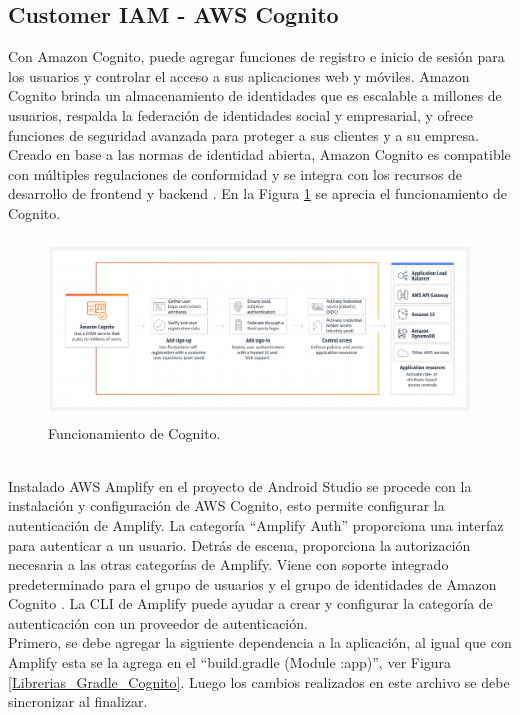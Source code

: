 \documentclass[a4paper,10pt, oneside, titlepage]{article}
\begin{document}
	\subsection{Customer IAM - AWS Cognito}
	Con Amazon Cognito, puede agregar funciones de registro e inicio de sesión para los usuarios y controlar el acceso a sus aplicaciones web y móviles. Amazon Cognito brinda un almacenamiento de identidades que es escalable a millones de usuarios, respalda la federación de identidades social y empresarial, y ofrece funciones de seguridad avanzada para proteger a sus clientes y a su empresa. Creado en base a las normas de identidad abierta, Amazon Cognito es compatible con múltiples regulaciones de conformidad y se integra con los recursos de desarrollo de frontend y backend \cite{Cognito}. En la Figura \ref{Funcionamiento_Cognito} se aprecia el funcionamiento de Cognito.
	\begin{figure}[!h]
		\centering
		\includegraphics[width = 1\linewidth, height = 4.8cm]{Funcionamiento_Cognito.png}
		\caption{Funcionamiento de Cognito.}
		\label{Funcionamiento_Cognito}
	\end{figure} \\
	\indent Instalado AWS Amplify en el proyecto de Android Studio se procede con la instalación y configuración de AWS Cognito, esto permite configurar la autenticación de Amplify. La categoría ``Amplify Auth'' proporciona una interfaz para autenticar a un usuario. Detrás de escena, proporciona la autorización necesaria a las otras categorías de Amplify. Viene con soporte integrado predeterminado para el grupo de usuarios y el grupo de identidades de Amazon Cognito . La CLI de Amplify puede ayudar a crear y configurar la categoría de autenticación con un proveedor de autenticación. \\\newline
	\indent Primero, se debe agregar la siguiente dependencia a la aplicación, al igual que con Amplify esta se la agrega en el ``build.gradle (Module :app)'', ver Figura \ref{Librerias_Gradle_Cognito}. Luego los cambios realizados en este archivo se debe sincronizar al finalizar.
\end{document}
